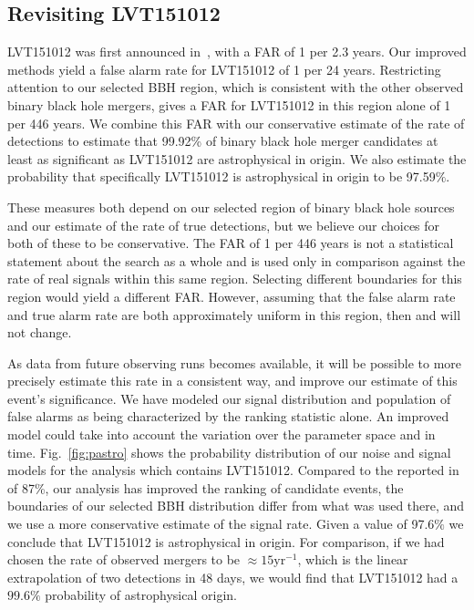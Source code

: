 \subsection{Revisiting LVT151012}

LVT151012 was first announced in~\cite{TheLIGOScientific:2016qqj}, with a FAR
of 1 per 2.3 years. Our improved methods yield a false alarm rate for LVT151012
of 1 per 24 years. Restricting attention to our selected BBH region, which is
consistent with the other observed binary black hole mergers, gives a FAR for
LVT151012 in this region alone of 1 per 446 years. We combine this FAR  with
our conservative estimate of the rate of detections to estimate that 99.92\% of
binary black hole merger candidates at least as significant as LVT151012 are
astrophysical in origin. We also estimate the probability that specifically
LVT151012 is astrophysical in origin to be 97.59$\%$.

These measures both depend on our selected region of binary black hole sources
and our estimate of the rate of true detections, but we believe our choices for
both of these to be conservative. The FAR of 1 per 446 years is not a
statistical statement about the search as a whole and is used only in
comparison against the rate of real signals within this same region. Selecting
different boundaries for this region would yield a different FAR. However,
assuming that the false alarm rate and true alarm rate are both approximately
uniform in this region, then \pastro{} and \tdr{} will not change.


As data from future observing runs becomes available, it will be possible to more precisely estimate this rate in a consistent way, and improve our estimate of this event's significance.  We have modeled our signal distribution and population of false alarms as being characterized by the ranking statistic \rankingstat{} alone. An improved model could take into account the variation over the parameter space and in time. Fig.~\ref{fig:pastro} shows the probability distribution of our noise and signal models for the analysis which contains LVT151012. Compared to the \pastro{} reported in~\cite{TheLIGOScientific:2016pea} of 87\%, our analysis has improved the ranking of candidate events, the boundaries of our selected BBH distribution differ from what was used there, and we use a more conservative estimate of the signal rate. Given a \pastro{} value of 97.6$\%$ we conclude that LVT151012 is astrophysical in origin. For comparison, if we had chosen the rate of observed mergers to be $\approx 15 \mathrm{yr}^{-1}$, which is the linear extrapolation of two detections in 48 days, we would find that LVT151012 had a $99.6\%$ probability of astrophysical origin.

